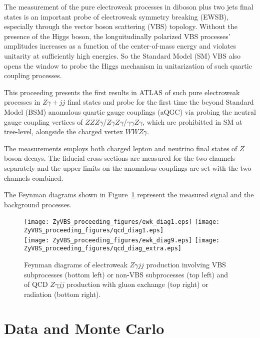 \documentclass[10pt]{article}
\begin{document}
The measurement of the pure electroweak processes in diboson plus two jets final states is an important probe of electroweak symmetry breaking (EWSB),
especially through the vector boson scattering (VBS) topology. Without the presence of the Higgs boson, the longuitudinally polarized VBS processes' amplitudes
increases as a function of the center-of-mass energy and violates unitarity at sufficiently high energies. So the Standard Model (SM) VBS also opens the window to
probe the Higgs mechanism in unitarization of such quartic coupling processes.

This proceeding presents the first results in ATLAS of such pure electroweak processes in $Z\gamma+jj$ final states and probe for the first time the beyond Standard Model (BSM)
anomalous quartic gauge couplings (aQGC) via probing the neutral gauge coupling vertices of $ZZZ\gamma$/$Z\gamma Z\gamma$/$\gamma \gamma Z\gamma$, which are prohibitted in SM at tree-level,
alongside the charged vertex $WWZ\gamma$.

The measurements employs both charged lepton and neutrino final states of $Z$ boson decays.
The fiducial cross-sections are measured for the two channels separately and the upper limits on the anomalous couplings are set with the two channels combined.

The Feynman diagrams shown in Figure~\ref{fig:fey_dia} represent the measured signal and the background processes.
\begin{figure}[h!]
\small
  \begin{center}
  \texttt{[image: ZyVBS\_proceeding\_figures/ewk\_diag1.eps]}
  \hspace{2cm}
  \texttt{[image: ZyVBS\_proceeding\_figures/qcd\_diag1.eps]} \\
  \texttt{[image: ZyVBS\_proceeding\_figures/ewk\_diag9.eps]}
  \hspace{2cm}
  \texttt{[image: ZyVBS\_proceeding\_figures/qcd\_diag\_extra.eps]}
  \caption{Feynman diagrams of electroweak $Z\gamma jj$ production
    involving VBS subprocesses (bottom left) or non-VBS subprocesses (top left) and of QCD $Z\gamma jj$ production with gluon exchange (top right) or radiation (bottom right).~\cite{jhep:ZyVBS_ATLAS}}
  \label{fig:fey_dia}
  \end{center}
\end{figure}

\section{Data and Monte Carlo}
\end{document}
